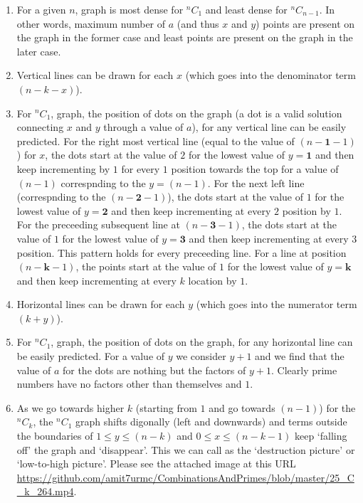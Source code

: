 \documentclass[12pt, twoside]{article}
\newcommand*{\Combination}[2]{{}^{#1}C_{#2}}%
\begin{document}
\begin{enumerate}
	\item For a given $n$, graph is most dense for $\Combination{n}{1}$ and least dense for $\Combination{n}{n-1}$. In other words, maximum number of $a$ (and thus $x$ and $y$) points are present on the graph in the former case and least points are present on the graph in the later case.
	\item Vertical lines can be drawn for each $x$ (which goes into the denominator term $(n-k-x)$). 
	\item For $\Combination{n}{1}$, graph, the position of dots on the graph (a dot is a valid solution connecting $x$ and $y$ through a value of $a$), for any vertical line can be easily predicted. For the right most vertical line (equal to the value of $(n-\textbf{1}-1)$) for $x$, the dots start at the value of $2$ for the lowest value of $y=\textbf{1}$ and then keep incrementing by $1$ for every \textbf{$1$} position towards the top for a value of $(n-1)$ correspnding to the $y=(n-1)$. For the next left line (correspnding to the $(n-\textbf{2}-1)$), the dots start at the value of $1$ for the lowest value of $y=\textbf{2}$ and then keep incrementing at every \textbf{$2$} position by $1$. For the preceeding subsequent line at $(n-\textbf{3}-1)$, the dots start at the value of $1$ for the lowest value of $y=\textbf{3}$ and then keep incrementing at every \textbf{$3$} position. This pattern holds for every preceeding line. For a line at position $(n-\textbf{k}-1)$, the points start at the value of $1$ for the lowest value of $y=\textbf{k}$ and then keep incrementing at every \textbf{$k$} location by $1$.
	\item Horizontal lines can be drawn for each $y$ (which goes into the numerator term $(k+y)$).
	\item For $\Combination{n}{1}$, graph, the position of dots on the graph, for any horizontal line can be easily predicted. For a value of $y$ we consider $y+1$ and we find that the value of $a$ for the dots are nothing but the factors of $y+1$. Clearly prime numbers have no factors other than themselves and $1$.
	\item As we go towards higher $k$ (starting from $1$ and go towards $(n-1)$) for the $\Combination{n}{k}$, the $\Combination{n}{1}$ graph shifts digonally (left and downwards) and terms outside the boundaries of $ 1 \leq y \leq (n-k)$ and $0 \leq x \leq (n-k-1)$ keep `falling off' the graph and `disappear'. This we can call as the `destruction picture' or `low-to-high picture'. Please see the attached image at this URL \url{https://github.com/amit7urmc/CombinationsAndPrimes/blob/master/25_C_k_264.mp4}.

\end{enumerate}
\end{document}
